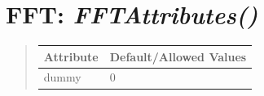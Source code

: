 \documentclass[letterpaper,10pt,english]{sphinxmanual}
\begin{document}
\begin{DUlineblock}{0em}
\item[] 
\end{DUlineblock}

\begin{DUlineblock}{0em}
\item[] 
\end{DUlineblock}


\section{\textbf{FFT}: \emph{FFTAttributes()}}
\label{attributes:fft-fftattributes}
\begin{DUlineblock}{0em}
\item[] 
\end{DUlineblock}
\begin{quote}

\begin{tabulary}{\linewidth}{|L|L|}
\hline

\textbf{Attribute}
 & 
\textbf{Default/Allowed Values}
\\
\hline
dummy
 & 
0
\\
\hline\end{tabulary}

\end{quote}

\begin{DUlineblock}{0em}
\item[] 
\end{DUlineblock}

\begin{DUlineblock}{0em}
\item[] 
\end{DUlineblock}
\end{document}
